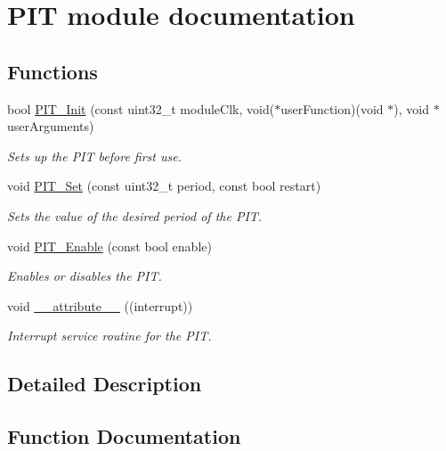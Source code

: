\hypertarget{group___p_i_t__module}{}\section{P\+I\+T module documentation}
\label{group___p_i_t__module}
\subsection*{Functions}
\begin{DoxyCompactItemize}
\item 
bool \hyperlink{group___p_i_t__module_gae69097a83912a25b357df1046aea9b52}{P\+I\+T\+\_\+\+Init} (const uint32\+\_\+t module\+Clk, void($\ast$user\+Function)(void $\ast$), void $\ast$user\+Arguments)
\begin{DoxyCompactList}\small\item\em Sets up the P\+I\+T before first use. \end{DoxyCompactList}\item 
void \hyperlink{group___p_i_t__module_gae012c6f6b7396828c558c92ad0a27ed5}{P\+I\+T\+\_\+\+Set} (const uint32\+\_\+t period, const bool restart)
\begin{DoxyCompactList}\small\item\em Sets the value of the desired period of the P\+I\+T. \end{DoxyCompactList}\item 
void \hyperlink{group___p_i_t__module_gaed902f6158d6681e4b05d078575e4b09}{P\+I\+T\+\_\+\+Enable} (const bool enable)
\begin{DoxyCompactList}\small\item\em Enables or disables the P\+I\+T. \end{DoxyCompactList}\item 
void \hyperlink{group___p_i_t__module_ga445500277ba0e363873b34cffc015745}{\+\_\+\+\_\+attribute\+\_\+\+\_\+} ((interrupt))
\begin{DoxyCompactList}\small\item\em Interrupt service routine for the P\+I\+T. \end{DoxyCompactList}\end{DoxyCompactItemize}


\subsection{Detailed Description}


\subsection{Function Documentation}
\hypertarget{group___p_i_t__module_ga445500277ba0e363873b34cffc015745}{}
